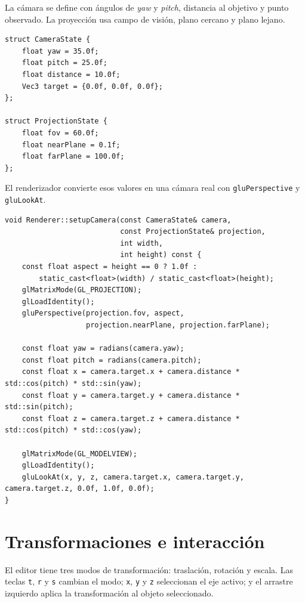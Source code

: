 \documentclass[a4paper,12pt]{article}
\begin{document}
La cámara se define con ángulos de \textit{yaw} y \textit{pitch}, distancia al objetivo y punto observado. La proyección usa campo de visión, plano cercano y plano lejano.


\begin{lstlisting}
struct CameraState {
    float yaw = 35.0f;
    float pitch = 25.0f;
    float distance = 10.0f;
    Vec3 target = {0.0f, 0.0f, 0.0f};
};

struct ProjectionState {
    float fov = 60.0f;
    float nearPlane = 0.1f;
    float farPlane = 100.0f;
};
\end{lstlisting}

El renderizador convierte esos valores en una cámara real con \texttt{gluPerspective} y \texttt{gluLookAt}.

\begin{lstlisting}
void Renderer::setupCamera(const CameraState& camera,
                           const ProjectionState& projection,
                           int width,
                           int height) const {
    const float aspect = height == 0 ? 1.0f :
        static_cast<float>(width) / static_cast<float>(height);
    glMatrixMode(GL_PROJECTION);
    glLoadIdentity();
    gluPerspective(projection.fov, aspect,
                   projection.nearPlane, projection.farPlane);

    const float yaw = radians(camera.yaw);
    const float pitch = radians(camera.pitch);
    const float x = camera.target.x + camera.distance * std::cos(pitch) * std::sin(yaw);
    const float y = camera.target.y + camera.distance * std::sin(pitch);
    const float z = camera.target.z + camera.distance * std::cos(pitch) * std::cos(yaw);

    glMatrixMode(GL_MODELVIEW);
    glLoadIdentity();
    gluLookAt(x, y, z, camera.target.x, camera.target.y, camera.target.z, 0.0f, 1.0f, 0.0f);
}
\end{lstlisting}

\section{Transformaciones e interacción}

El editor tiene tres modos de transformación: traslación, rotación y escala. Las teclas \texttt{t}, \texttt{r} y \texttt{s} cambian el modo; \texttt{x}, \texttt{y} y \texttt{z} seleccionan el eje activo; y el arrastre izquierdo aplica la transformación al objeto seleccionado.
\end{document}
